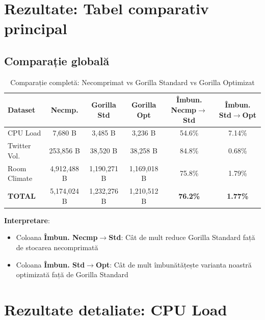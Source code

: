 \section{Rezultate: Tabel comparativ principal}

\subsection{Comparație globală}

\begin{table}[h]
\centering
\small
\begin{tabular}{@{}lccccc@{}}
\toprule
\textbf{Dataset} & \textbf{Necmp.} & \textbf{Gorilla Std} & \textbf{Gorilla Opt} & \textbf{Îmbun. Necmp$\rightarrow$Std} & \textbf{Îmbun. Std$\rightarrow$Opt} \\
\midrule
CPU Load & 7,680 B & 3,485 B & 3,236 B & 54.6\% & 7.14\% \\
Twitter Vol. & 253,856 B & 38,520 B & 38,258 B & 84.8\% & 0.68\% \\
Room Climate & 4,912,488 B & 1,190,271 B & 1,169,018 B & 75.8\% & 1.79\% \\
\midrule
\textbf{TOTAL} & 5,174,024 B & 1,232,276 B & 1,210,512 B & \textbf{76.2\%} & \textbf{1.77\%} \\
\bottomrule
\end{tabular}
\caption{Comparație completă: Necomprimat vs Gorilla Standard vs Gorilla Optimizat}
\label{tab:full-comparison}
\end{table}

\textbf{Interpretare}:
\begin{itemize}
    \item Coloana \textbf{Îmbun. Necmp$\rightarrow$Std}: Cât de mult reduce Gorilla Standard față de stocarea necomprimată
    \item Coloana \textbf{Îmbun. Std$\rightarrow$Opt}: Cât de mult îmbunătățește varianta noastră optimizată față de Gorilla Standard
\end{itemize}

\section{Rezultate detaliate: CPU Load}

